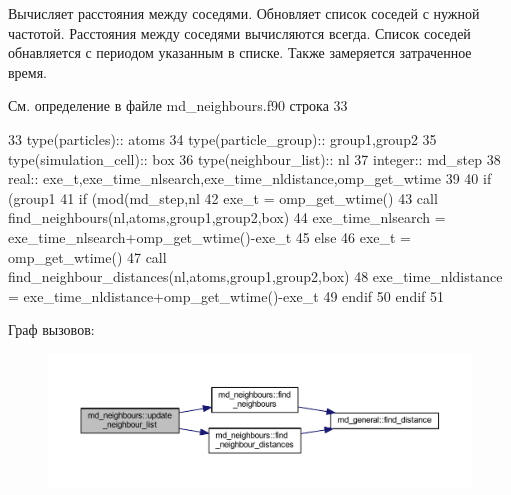 Вычисляет расстояния между соседями. Обновляет список соседей с нужной частотой.  Расстояния между соседями вычисляются всегда. Список соседей обнавляется с периодом указанным в списке. Также замеряется затраченное время. 



См. определение в файле md\+\_\+neighbours.\+f90 строка 33


\begin{DoxyCode}
33     \textcolor{keywordtype}{type}(particles)::   atoms
34     \textcolor{keywordtype}{type}(particle\_group):: group1,group2
35     \textcolor{keywordtype}{type}(simulation\_cell):: box
36     \textcolor{keywordtype}{type}(neighbour\_list):: nl
37     \textcolor{keywordtype}{integer}:: md\_step
38     \textcolor{keywordtype}{real}:: exe\_t,exe\_time\_nlsearch,exe\_time\_nldistance,omp\_get\_wtime
39 
40     \textcolor{keywordflow}{if} (group1%
41         \textcolor{keywordflow}{if} (mod(md\_step,nl%
42             exe\_t = omp\_get\_wtime()
43             \textcolor{keyword}{call }find\_neighbours(nl,atoms,group1,group2,box)
44             exe\_time\_nlsearch = exe\_time\_nlsearch+omp\_get\_wtime()-exe\_t
45         \textcolor{keywordflow}{else}
46             exe\_t = omp\_get\_wtime()
47             \textcolor{keyword}{call }find\_neighbour\_distances(nl,atoms,group1,group2,box)
48             exe\_time\_nldistance = exe\_time\_nldistance+omp\_get\_wtime()-exe\_t
49 \textcolor{keywordflow}{        endif}
50 \textcolor{keywordflow}{    endif}
51     
\end{DoxyCode}
Граф вызовов\+:\nopagebreak
\begin{figure}[H]
\begin{center}
\leavevmode
\includegraphics[width=350pt]{namespacemd__neighbours_aa3afc442e82c37b20e8963af79455747_cgraph}
\end{center}
\end{figure}
